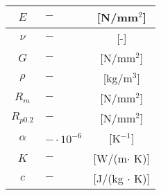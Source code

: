 

	\begin{tabular}{clc}
	\hline
	$E$ & $-$ &[N/mm$^2$]\\ 				%
	\hline
	$\nu$ & $-$ & [-]\\						%
	\hline
	$G$ & $-$ & [N/mm$^2$]\\				%
	\hline
	$\rho$ & $-$ & [kg/m$^3$]\\				%
	\hline
	$R_m$ & $-$ & [N/mm$^2$]\\ 				%
	\hline
	$R_{p0.2}$ & $-$ & [N/mm$^2$]\\ 		%
	\hline
	$\alpha$ & $-\cdot 10^{-6}$ & [K$^{-1}$]\\			%
	\hline
	$K$ & $-$ & [W/(m$\cdot$ K)]\\ 			%
	\hline
	$c$ & $-$ & [J/(kg $\cdot$ K)]\\		%
	\hline
	\end{tabular}
	\caption{•} %
	\label{mat_}



\begin{table}[!htb]
	\centering
    \begin{minipage}{.32\linewidth}
      \centering
        
    \end{minipage}
    \hspace{1cm}
    \begin{minipage}{.32\linewidth}
      \centering
        
    \end{minipage}
    \\
    \vspace{1cm}
    \begin{minipage}{.32\linewidth}
      \centering
        
    \end{minipage}
    \hspace{1cm}
    \begin{minipage}{.32\linewidth}
      \centering
        
    \end{minipage}
\end{table}

